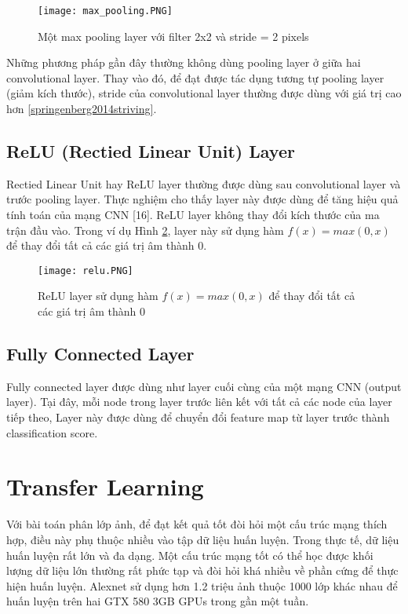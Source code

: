 \begin{figure}[h!]
	\centering
	\captionsetup{width=0.7\textwidth}
	\texttt{[image: max\_pooling.PNG]}
	\caption{Một max pooling layer với filter 2x2 và stride = 2 pixels}
    \label{fig:max_pooling}
\end{figure}

Những phương pháp gần đây thường không dùng pooling layer ở giữa hai convolutional layer. Thay vào đó, để đạt được tác dụng tương tự pooling layer (giảm kích thước), stride của convolutional layer thường được dùng với giá trị cao hơn \ref{springenberg2014striving}.

\subsection*{ReLU (Rectied Linear Unit) Layer}
Rectied Linear Unit hay ReLU layer thường được dùng sau convolutional layer và trước pooling layer. Thực nghiệm cho thấy layer này được dùng để tăng hiệu quả tính toán của mạng CNN [16].
ReLU layer không thay đổi kích thước của ma trận đầu vào. Trong ví dụ Hình \ref{fig:relu}, layer này sử dụng hàm $f(x) = max(0, x)$ để thay đổi tất cả các giá trị âm thành 0.

\begin{figure}[h!]
	\centering
	\captionsetup{width=0.7\textwidth}
	\texttt{[image: relu.PNG]}
	\caption{ReLU layer sử dụng hàm $f(x) = max(0, x)$ để thay đổi tất cả các giá trị âm thành 0}
    \label{fig:relu}
\end{figure}

\subsection*{Fully Connected Layer}
Fully connected layer được dùng như layer cuối cùng của một mạng CNN (output layer). Tại đây, mỗi node trong layer trước liên kết với tất cả các node của layer tiếp theo, Layer này được dùng để chuyển đổi feature map từ layer trước thành classification score.

\section{Transfer Learning}
Với bài toán phân lớp ảnh, để đạt kết quả tốt đòi hỏi một cấu trúc mạng thích hợp, điều này phụ thuộc nhiều vào tập dữ liệu huấn luyện. Trong thực tế, dữ liệu huấn luyện rất lớn và đa dạng. Một cấu trúc mạng tốt có thể học được khối lượng dữ liệu lớn thường rất phức tạp và đòi hỏi khá nhiều về phần cứng để thực hiện huấn luyện. Alexnet \cite{krizhevsky2012imagenet} sử dụng hơn 1.2 triệu ảnh thuộc 1000 lớp khác nhau để huấn luyện trên hai GTX 580 3GB GPUs trong gần một tuần.

